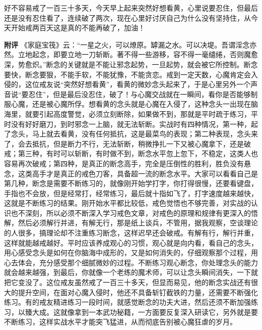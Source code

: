 \begin{case}
    好不容易戒了一百三十多天，今天早上起来突然好想看黄，心里说要忍住，但最后还是没有忍住看了，连续破了两次，现在心里好讨厌自己为什么没有坚持住，从今天开始戒两百天这是真的不能再破了，加油！

    \textbf{附评} 《家庭宝筏》云：“一星之火，可以燎原。罅漏之水。可以决堤。吾谓淫念亦然。立地起念，即要立地一刀斩断。著不得一些游移，容不得一毫缱绻，否则魔愈深，势愈炽。”断念的关键就是不能让邪念起势，一旦起势，就会被它所控制。断念要快，断念要狠，不能手软，不能犹豫，不能贪恋。戒到一定天数，心魔肯定会入侵的，这位戒友说“突然好想看黄”，看黄的微妙念头起来了，于是心里另外一个声音说“要忍住”，但是最后没忍住，破了！与心魔交战就在一瞬间，看你是否能够制服心魔，还是被心魔所俘。想看黄的念头就是心魔在入侵了，这种念头一出现在脑海里，就要引起高度警觉，必须立刻断除，如果做不到，那就是平时疏于练习，平时没有好好磨刀，到时邪念一上脑，就无法斩断。实战时有四种情况，第一种，起了念头，马上就去看黄，没有任何抵抗，这是最菜鸟的表现；第二种表现，念头来了，会去抵抗，但是断力不行，无法斩断，稍微挣扎一下又被心魔拿下，还是破戒；第三种，有时可以斩断，有时做不到，断念水平忽上忽下，不稳定，这类人也容易再次破戒；第四种，是真正的断念高手，完全是压倒性的胜利，胜负没有悬念，这类高手才是真正的戒色刀客，具备超一流的断念水平。大家可以看看自己是第几种，断念是需要不断练习的，就像刚开始学打字，你打得很慢，还要看键盘，手指也不会放，但是经常打，经常练习，最后就十指如飞了，打字速度越来越快，这就是不断练习的结果。刚开始水平都比较低，戒色觉悟也不够完善，对实战的认识也不深刻，所以必须不断深入学习戒色文章，对戒色的原理和规律有更深入的悟解，然后必须解行并进，有解无行，那是纸上谈兵，不管用，据我观察，空谈理论的人很多，搞理论却不注重练习断念，这样迟早还会破戒。有解有行，解行并重，这样就能越戒越好。平时应该养成观心的习惯，观心就是向内看，看自己的念头，用心感受念头是如何在你脑海中成形的，又是如何消失的，仔细观察那个过程，用心去体会，充分感受那个细腻微妙的过程。不断练习观心断念，你处理念头的能力就会越来越强，到最后，你就像一个老练的魔术师，可以让念头瞬间消失，一下就把它变没了。这位戒友虽然戒了一百三十多天，但显而易见，他的断念实战还有很大的提升空间，在面对心魔入侵时，他还不具备斩钉截铁的力量，还需要不断强化练习。有的戒友精进练习一段时间，就感觉断念的功夫大进，然后还须不断加强练习，以臻大成。这就像拿到一本武功秘籍，一方面要反复深入研读它，另外就是要不断练习，这样实战水平才能突飞猛进，从而彻底告别被心魔狂虐的岁月。
\end{case}

